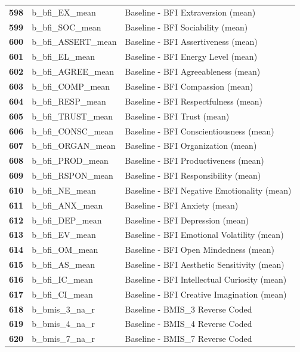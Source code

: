 \documentclass[
  letterpaper,
  DIV=11,
  numbers=noendperiod]{scrartcl}
\begin{document}
\begin{longtable}[t]{>{}cll}
\textbf{598} & b\_bfi\_EX\_mean & Baseline - BFI Extraversion (mean)\\
\textbf{599} & b\_bfi\_SOC\_mean & Baseline - BFI Sociability (mean)\\
\textbf{600} & b\_bfi\_ASSERT\_mean & Baseline - BFI Assertiveness (mean)\\
\addlinespace
\textbf{601} & b\_bfi\_EL\_mean & Baseline - BFI Energy Level (mean)\\
\textbf{602} & b\_bfi\_AGREE\_mean & Baseline - BFI Agreeableness (mean)\\
\textbf{603} & b\_bfi\_COMP\_mean & Baseline - BFI Compassion (mean)\\
\textbf{604} & b\_bfi\_RESP\_mean & Baseline - BFI Respectfulness (mean)\\
\textbf{605} & b\_bfi\_TRUST\_mean & Baseline - BFI Trust (mean)\\
\addlinespace
\textbf{606} & b\_bfi\_CONSC\_mean & Baseline - BFI Conscientiousness (mean)\\
\textbf{607} & b\_bfi\_ORGAN\_mean & Baseline - BFI Organization (mean)\\
\textbf{608} & b\_bfi\_PROD\_mean & Baseline - BFI Productiveness (mean)\\
\textbf{609} & b\_bfi\_RSPON\_mean & Baseline - BFI Responsibility (mean)\\
\textbf{610} & b\_bfi\_NE\_mean & Baseline - BFI Negative Emotionality (mean)\\
\addlinespace
\textbf{611} & b\_bfi\_ANX\_mean & Baseline - BFI Anxiety (mean)\\
\textbf{612} & b\_bfi\_DEP\_mean & Baseline - BFI Depression (mean)\\
\textbf{613} & b\_bfi\_EV\_mean & Baseline - BFI Emotional Volatility (mean)\\
\textbf{614} & b\_bfi\_OM\_mean & Baseline - BFI Open Mindedness (mean)\\
\textbf{615} & b\_bfi\_AS\_mean & Baseline - BFI Aesthetic Sensitivity (mean)\\
\addlinespace
\textbf{616} & b\_bfi\_IC\_mean & Baseline - BFI Intellectual Curiosity (mean)\\
\textbf{617} & b\_bfi\_CI\_mean & Baseline - BFI Creative Imagination (mean)\\
\textbf{618} & b\_bmis\_3\_na\_r & Baseline - BMIS\_3 Reverse Coded\\
\textbf{619} & b\_bmis\_4\_na\_r & Baseline - BMIS\_4 Reverse Coded\\
\textbf{620} & b\_bmis\_7\_na\_r & Baseline - BMIS\_7 Reverse Coded\\

\end{longtable}
\end{document}
